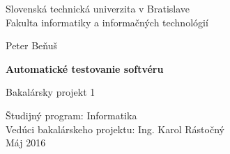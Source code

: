 \documentclass[11pt,twoside,slovak,a4paper]{article}
\begin{document}
	
	\begin{titlepage}
		\newlength{\myind}
		\addtolength{\myind}{57mm}
		
		\newlength{\myrulelength}
		\addtolength{\myrulelength}{\textwidth}
		\newcommand{\myrule}{\parbox{\myrulelength}{\hrulefill}}
		\newcommand{\mybox}[1]{\parbox{\myrulelength}{#1}}
		\newcommand{\mycbox}[1]{\parbox{\myrulelength}{\centering #1}}
		
		\begin{center}
			\large 		Slovenská technická univerzita v Bratislave\\
			Fakulta informatiky a informačných technológií	
		\end{center}

		
		\vspace{4mm}
		\myrule
		
		\vspace{55mm}
		
		\mycbox{Peter Beňuš}
		
		\vspace{10mm}
		
		\mycbox{\LARGE \textbf{Automatické testovanie softvéru}}
		
		\vspace{4mm}
		\mycbox{\large Bakalársky projekt 1}
		
		
		\vfill
		\begin{flushleft}
			Študijný program: Informatika\\
			Vedúci bakalárskeho projektu: Ing. Karol Rástočný\\
			Máj 2016
		\end{flushleft}
	\end{titlepage}
	
\end{document}
